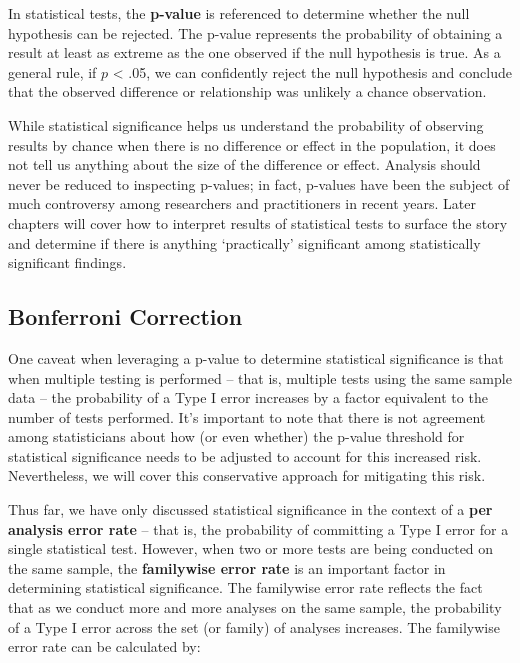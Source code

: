 \documentclass[]{book}
\begin{document}
In statistical tests, the \textbf{p-value} is referenced to determine whether the null hypothesis can be rejected. The p-value represents the probability of obtaining a result at least as extreme as the one observed if the null hypothesis is true. As a general rule, if \(p\) \textless{} .05, we can confidently reject the null hypothesis and conclude that the observed difference or relationship was unlikely a chance observation.

While statistical significance helps us understand the probability of observing results by chance when there is no difference or effect in the population, it does not tell us anything about the size of the difference or effect. Analysis should never be reduced to inspecting p-values; in fact, p-values have been the subject of much controversy among researchers and practitioners in recent years. Later chapters will cover how to interpret results of statistical tests to surface the story and determine if there is anything `practically' significant among statistically significant findings.

\hypertarget{bonferroni-correction}{%
\subsection{Bonferroni Correction}\label{bonferroni-correction}}

One caveat when leveraging a p-value to determine statistical significance is that when multiple testing is performed -- that is, multiple tests using the same sample data -- the probability of a Type I error increases by a factor equivalent to the number of tests performed. It's important to note that there is not agreement among statisticians about how (or even whether) the p-value threshold for statistical significance needs to be adjusted to account for this increased risk. Nevertheless, we will cover this conservative approach for mitigating this risk.

Thus far, we have only discussed statistical significance in the context of a \textbf{per analysis error rate} -- that is, the probability of committing a Type I error for a single statistical test. However, when two or more tests are being conducted on the same sample, the \textbf{familywise error rate} is an important factor in determining statistical significance. The familywise error rate reflects the fact that as we conduct more and more analyses on the same sample, the probability of a Type I error across the set (or family) of analyses increases. The familywise error rate can be calculated by:
\end{document}
